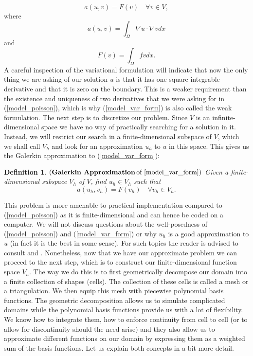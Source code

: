 \documentclass[12pt,a4paper]{article}
\newtheorem{definition}[theorem]{Definition}
\theoremstyle{definition}
\begin{document}
\begin{equation}\label{model_var_form}
a\left(u,v\right)=F\left(v\right) \quad \forall v \in V,
\end{equation}
where 
\begin{equation}
a\left(u,v\right) = \int_{\Omega}\nabla u \cdot \nabla v dx 
\end{equation} 
and
\begin{equation}
F\left(v\right) = \int_{\Omega}fvdx.
\end{equation}
A careful inspection of the variational formulation will indicate that now the only thing we are asking of our solution $u$ is that it has one square-integrable derivative and that it is zero on the boundary.  This is a weaker requirement than the existence and uniqueness of two derivatives that we were asking for in (\ref{model_poisson}), which is why (\ref{model_var_form}) is also called the weak formulation.  The next step is to discretize our problem.  Since $V$ is an infinite-dimensional space we have no way of practically searching for a solution in it.   Instead, we will restrict our search in a finite-dimensional subspace of $V$, which we shall call $V_h$ and look for an approximation $u_h$ to $u$ in this space.  This gives us the Galerkin approximation to (\ref{model_var_form}):

\theoremstyle{definition}
\begin{definition}{$\left(\textbf{Galerkin Approximation}\,\text{of \ref{model_var_form}}\right)$} 
	Given a finite-dimensional subspace $V_h$ of $V$, find  $u_h \in V_h$ such that
	\begin{equation}
a\left(u_h,v_h\right)=F\left(v_h\right) \quad \forall v_h \in V_h.
	\end{equation}
\end{definition}
This problem is more amenable to practical implementation compared to (\ref{model_poisson}) as it is finite-dimensional and can hence be coded on a computer.  We will not discuss questions about the well-posedness of (\ref{model_poisson}) and (\ref{model_var_form}) or why $u_h$ is a good approximation to $u$ (in fact it is the best in some sense).  For such topics the reader is advised to consult \cite{brenner2007mathematical} and \cite{ern2013theory}. Nonetheless, now that we have our approximate problem we can proceed to the next step, which is  to construct our finite-dimensional function space $V_h$.  
The way we do this is to first geometrically decompose our domain into a finite collection of shapes (cells).  The collection of these cells is called a mesh or a triangulation.  We then equip this mesh with piecewise polynomial basis functions.  The geometric decomposition allows us to simulate complicated domains while the polynomial basis functions provide us with a lot of flexibility.  We know how to integrate them, how to enforce continuity from cell to cell (or to allow for discontinuity should the need arise) and they also allow us to approximate different functions on our domain  by expressing them as a weighted sum of the basis functions.  Let us explain both concepts in a bit more detail.
\end{document}
